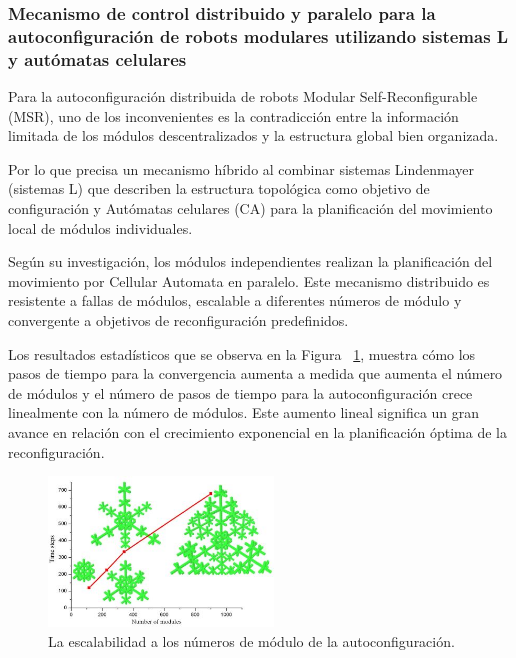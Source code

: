\documentclass[10pt,conference]{IEEEtran}
\begin{document}
\vspace{2.5mm}    
\subsubsection{\textbf{Mecanismo de control distribuido y paralelo para la autoconfiguración de robots modulares utilizando sistemas L y autómatas celulares}}

    Para la autoconfiguración distribuida de robots Modular Self-Reconfigurable (MSR), uno de los inconvenientes es la contradicción entre la información limitada de los módulos descentralizados y la estructura global bien organizada.
    
    Por lo que  precisa un mecanismo híbrido al combinar sistemas Lindenmayer (sistemas L) que describen la estructura topológica como objetivo de configuración y Autómatas celulares (CA) para la planificación del movimiento local de módulos individuales.
    
    Según su investigación, los módulos independientes realizan la planificación del movimiento por Cellular Automata en paralelo. Este mecanismo distribuido es resistente a fallas de módulos, escalable a diferentes números de módulo y convergente a objetivos de reconfiguración predefinidos.
    
    Los resultados estadísticos que se observa en la Figura  ~\ref{Tec.3}, muestra cómo los pasos de tiempo para la convergencia aumenta a medida que aumenta el número de módulos y 
    el número de pasos de tiempo para la autoconfiguración crece linealmente con la
    número de módulos. Este aumento lineal significa un gran avance en relación con el
    crecimiento exponencial en la planificación óptima de la reconfiguración.
    
    \begin{figure}[H]
    \begin{center}
    \includegraphics[width=6cm, height=4cm]{Ind.Tecnolo/Rob.JPG}
    \caption{La escalabilidad a los números de módulo de la autoconfiguración.}
    \label{Tec.3} 
    \end{center}
    \end{figure}
\end{document}
